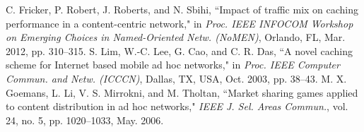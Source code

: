 \documentclass[10pt,journal,compsoc,onecolumn]{IEEEtran}
\begin{document}
\begin{thebibliography}{99}
C. Fricker, P. Robert, J. Roberts, and N. Sbihi, ``Impact of traffic mix on caching performance in a content-centric network," in \emph{Proc. IEEE INFOCOM Workshop on Emerging Choices in Named-Oriented Netw. (NoMEN)}, Orlando, FL, Mar. 2012, pp. 310--315.
S. Lim, W.-C. Lee, G. Cao, and C. R. Das, ``A novel caching scheme for Internet based mobile ad hoc networks," in
\emph{Proc. IEEE Computer Commun. and Netw. (ICCCN)}, Dallas, TX, USA, Oct. 2003, pp. 38--43.
M. X. Goemans, L. Li, V. S. Mirrokni, and M. Tholtan, ``Market sharing games applied to content distribution in ad hoc networks," \emph{IEEE J. Sel. Areas Commun.}, vol. 24, no. 5, pp. 1020--1033, May. 2006.
\end{thebibliography}
%
%
\end{document}
